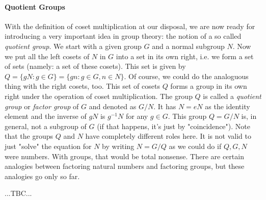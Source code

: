 \paragraph{Quotient Groups}
With the definition of coset multiplication at our disposal, we are now ready for introducing a very important idea in group theory: the notion of a so called \emph{quotient group}. We start with a given group $G$ and a normal subgroup $N$. Now we put all the left cosets of $N$ in $G$ into a set in its own right, i.e. we form a set of sets (namely: a set of these cosets). This set is given by $Q = \{ g N : g \in G \} =  \{ g n : g \in G, n \in N \}$. Of course, we could do the analoguous thing with the right cosets, too. This set of cosets $Q$ forms a group in its own right under the operation of coset multiplication. The group $Q$ is called a \emph{quotient group} or \emph{factor group} of $G$ and denoted as $G / N$. It has $N = e N$ as the identity element and the inverse of $g N$ is $g^{-1} N$ for any $g \in G$. This group $Q = G / N$ is, in general, not a subgroup of $G$ (if that happens, it's just by "coincidence"). Note that the groups $Q$ and $N$ have completely different roles here. It is not valid to just "solve" the equation for $N$ by writing $N = G / Q$ as we could do if $Q,G,N$ were numbers. With groups, that would be total nonsense. There are certain analogies between factoring natural numbers and factoring groups, but these analogies go only so far. 

...TBC...

\medskip
[TODO: Figure out if there are special cases where $Q = G / N \Leftrightarrow N = G / Q$ does indeed work out. Maybe when both $Q$ and $N$ are both (maximal) normal subgroups of $G$?]






